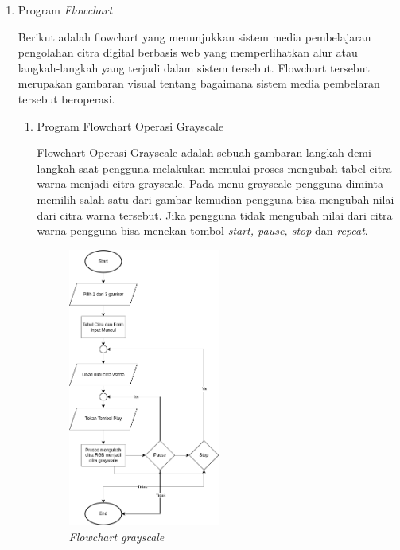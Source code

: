 \begin{enumerate}[leftmargin=1cm, itemindent=0.6cm,labelwidth=15pt, labelsep=5pt, listparindent=1cm,align=left]
\begin{enumerate}[leftmargin=1cm, itemindent=0.6cm,labelwidth=15pt, labelsep=5pt, listparindent=1cm,align=left]
      \item Program \textit{Flowchart}

Berikut adalah flowchart yang menunjukkan sistem media pembelajaran pengolahan citra digital berbasis web yang memperlihatkan alur atau langkah-langkah yang terjadi dalam sistem tersebut. Flowchart tersebut merupakan gambaran visual tentang bagaimana sistem media pembelaran tersebut beroperasi.

\begin{enumerate}[leftmargin=1cm, itemindent=0.6cm,labelwidth=15pt, labelsep=5pt, listparindent=1cm,align=left]

    \item Program Flowchart Operasi Grayscale

        Flowchart Operasi Grayscale adalah sebuah gambaran langkah demi langkah saat pengguna melakukan memulai proses mengubah tabel citra warna menjadi citra grayscale. Pada menu grayscale pengguna diminta memilih salah satu dari gambar kemudian pengguna bisa mengubah nilai dari citra warna tersebut. Jika pengguna tidak mengubah nilai dari citra warna pengguna bisa menekan tombol \textit{start, pause, stop} dan \textit{repeat}.

          \begin{figure}[ht]
    	      \includegraphics[width=0.5\textwidth, center]{images/flowchart-grayscale.png}
              \caption{\textit{Flowchart grayscale}}
          \end{figure}


\end{enumerate}
\end{enumerate}
\end{enumerate}
